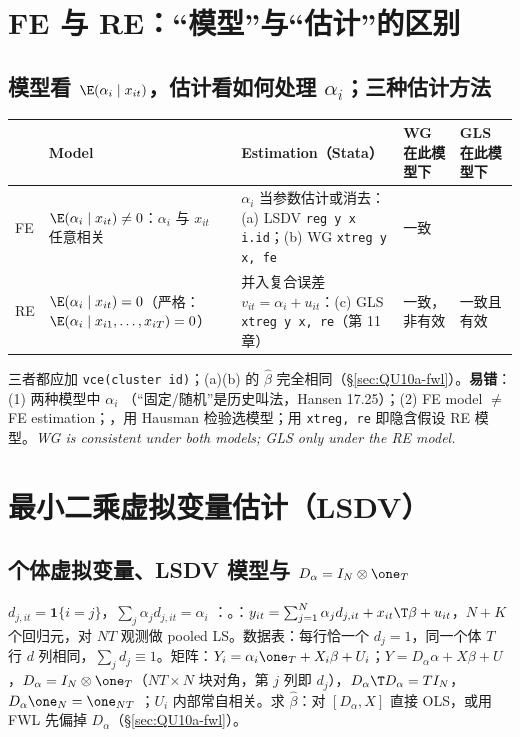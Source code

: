 \section{FE 与 RE：“模型”与“估计”的区别}

\subsection{模型看 \texorpdfstring{$\E(\alpha_i\mid x_{it})$}{E(alpha|x)}，估计看如何处理 \texorpdfstring{$\alpha_i$}{alpha\_i}；三种估计方法}
\begin{center}\footnotesize\renewcommand{\arraystretch}{1.05}
\begin{tabularx}{\linewidth}{@{}p{0.6cm}p{4.3cm}Lp{2.1cm}p{2.1cm}@{}}
\toprule
 & \textbf{Model} & \textbf{Estimation}（Stata） & WG 在此模型下 & GLS 在此模型下\\
\midrule
FE & $\E(\alpha_i\mid x_{it})\neq0$：$\alpha_i$ 与 $x_{it}$ 任意相关 & $\alpha_i$ 当参数估计或消去：(a) LSDV \texttt{reg y x i.id}；(b) WG \texttt{xtreg y x, fe} & 一致 & \leavevmode{}\\
RE & $\E(\alpha_i\mid x_{it})=0$（严格：$\E(\alpha_i\mid x_{i1},\dots,x_{iT})=0$） & 并入复合误差 $v_{it}=\alpha_i+u_{it}$：(c) GLS \texttt{xtreg y x, re}（第 11 章） & 一致，非有效 & 一致且有效\\
\bottomrule
\end{tabularx}
\end{center}
三者都应加 \texttt{vce(cluster id)}；(a)(b) 的 $\hat\beta$ 完全相同（§\ref{sec:QU10a-fwl}）。\textbf{易错}：(1) 两种模型中 $\alpha_i$ （“固定/随机”是历史叫法，Hansen 17.25）；(2) FE model $\neq$ FE estimation；，用 Hausman 检验选模型；用 \texttt{xtreg, re} 即隐含假设 RE 模型。\textit{WG is consistent under both models; GLS only under the RE model.}

\section{最小二乘虚拟变量估计（LSDV）}\label{sec:QU10a-lsdv}

\subsection{个体虚拟变量、LSDV 模型与 \texorpdfstring{$D_\alpha=I_N\otimes\one_T$}{D = I\_N kron 1\_T}}
$d_{j,it}=\mathbf 1\{i=j\}$，$\sum_j\alpha_jd_{j,it}=\alpha_i$ ：。：$y_{it}=\sum_{j=1}^N\alpha_jd_{j,it}+x_{it}\T\beta+u_{it}$，$N+K$ 个回归元，对 $NT$ 观测做 pooled LS。数据表：每行恰一个 $d_j=1$，同一个体 $T$ 行 $d$ 列相同，$\sum_jd_j\equiv1$。矩阵：$Y_i=\alpha_i\one_T+X_i\beta+U_i$；$Y=D_\alpha\alpha+X\beta+U$，$D_\alpha=I_N\otimes\one_T$（$NT\times N$ 块对角，第 $j$ 列即 $d_j$），$D_\alpha\T D_\alpha=TI_N$，$D_\alpha\one_N=\one_{NT}$ ；$U_i$ 内部常自相关。求 $\hat\beta$：对 $[D_\alpha,X]$ 直接 OLS，或用 FWL 先偏掉 $D_\alpha$（§\ref{sec:QU10a-fwl}）。

